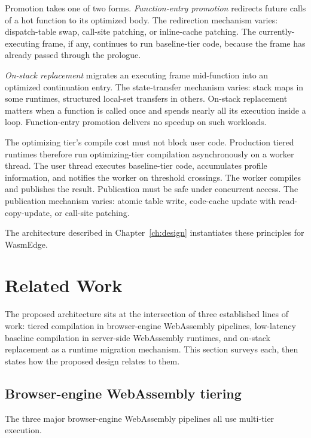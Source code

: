 Promotion takes one of two forms. \emph{Function-entry promotion} redirects future calls of a hot function to its optimized body. The redirection mechanism varies: dispatch-table swap, call-site patching, or inline-cache patching. The currently-executing frame, if any, continues to run baseline-tier code, because the frame has already passed through the prologue.

\emph{On-stack replacement} migrates an executing frame mid-function into an optimized continuation entry. The state-transfer mechanism varies: stack maps in some runtimes, structured local-set transfers in others. On-stack replacement matters when a function is called once and spends nearly all its execution inside a loop. Function-entry promotion delivers no speedup on such workloads.

The optimizing tier's compile cost must not block user code. Production tiered runtimes therefore run optimizing-tier compilation asynchronously on a worker thread. The user thread executes baseline-tier code, accumulates profile information, and notifies the worker on threshold crossings. The worker compiles and publishes the result. Publication must be safe under concurrent access. The publication mechanism varies: atomic table write, code-cache update with read-copy-update, or call-site patching.

The architecture described in Chapter~\ref{ch:design} instantiates these principles for WasmEdge.

\section{Related Work}
\label{sec:bg:related}

The proposed architecture sits at the intersection of three established lines of work: tiered compilation in browser-engine WebAssembly pipelines, low-latency baseline compilation in server-side WebAssembly runtimes, and on-stack replacement as a runtime migration mechanism. This section surveys each, then states how the proposed design relates to them.

\subsection{Browser-engine WebAssembly tiering}
\label{sec:bg:related:browser}

The three major browser-engine WebAssembly pipelines all use multi-tier execution.

